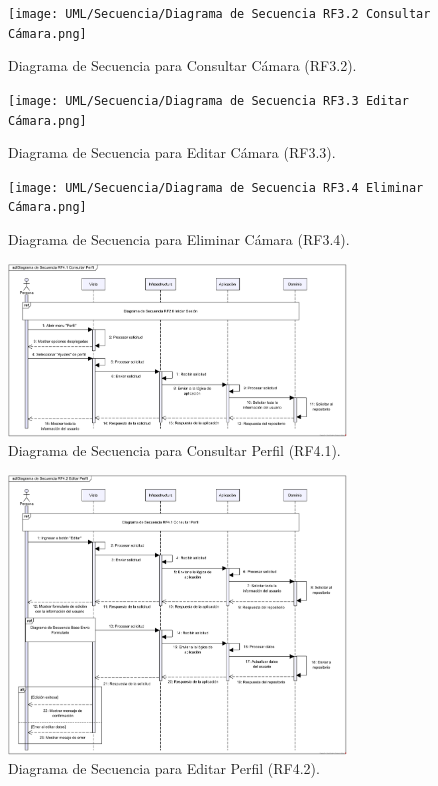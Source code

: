 \begin{figure}[H]
	\centering
		\caption{Diagrama de Secuencia para Consultar Cámara (RF3.2).}
	\texttt{[image: UML/Secuencia/Diagrama de Secuencia RF3.2 Consultar Cámara.png]}
\end{figure}


\begin{figure}[H]
	\centering
	\caption{Diagrama de Secuencia para Editar Cámara (RF3.3).}
 \texttt{[image: UML/Secuencia/Diagrama de Secuencia RF3.3 Editar Cámara.png]}
\end{figure}


\begin{figure}[H]
	\centering
		\caption{Diagrama de Secuencia para Eliminar Cámara (RF3.4).}
	\texttt{[image: UML/Secuencia/Diagrama de Secuencia RF3.4 Eliminar Cámara.png]}
\end{figure}


\begin{figure}[H]
	\centering
	\caption{Diagrama de Secuencia para Consultar Perfil (RF4.1).}
 \includegraphics[width=0.8\textwidth]{UML/Secuencia/Diagrama de Secuencia RF4.1 Consultar Perfil.png}
\end{figure}


\begin{figure}[H]
	\centering
		\caption{Diagrama de Secuencia para Editar Perfil (RF4.2).}
	\includegraphics[width=0.8\textwidth]{UML/Secuencia/Diagrama de Secuencia RF4.2 Editar Perfil.png}
\end{figure}


